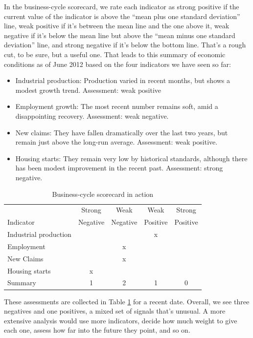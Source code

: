 In the business-cycle scorecard,
we rate each indicator as strong positive if
the current value of the indicator is above the
``mean plus one standard deviation'' line,
weak positive if it's between the mean line and the one above it,
weak negative if it's below the mean line but above
the ``mean minus one standard deviation'' line,
and strong negative if it's below the bottom line.
That's a rough cut, to be sure, but a useful one.
That leads to this summary of economic conditions as of June 2012
based on the four indicators we have seen so far:
\begin{itemize}
\item Industrial production:  Production varied in recent months, but shows a modest growth trend.
Assessment:  weak positive

\item Employment growth:  The most recent number remains soft, amid a disappointing recovery. Assessment:  weak negative.

\item New claims:  They have fallen dramatically
over the last two years, but remain just above the long-run average.
Assessment:  weak positive.
\item Housing starts:  They remain very low by historical standards,
although there has been modest improvement in the recent past.
Assessment:  strong negative.
\end{itemize}


\begin{table}[h!]
\centering
\caption{Business-cycle scorecard in action} %
\begin{tabular}{lcccc}
\toprule
            &  Strong    &  Weak  &  Weak   &  Strong  \\
Indicator   &  Negative  & Negative & Positive & Positive \\
\midrule
Industrial production  &&& x \\
Employment             && x &  \\
New Claims             && x \\
Housing starts         & x &  \\
\midrule
Summary                & 1 & 2 & 1 & 0 \\
\bottomrule
\end{tabular}
\label{tab:scorecard}
\end{table}

These assessments are collected in Table \ref{tab:scorecard}
for a recent date.
Overall, we see three negatives and one positives,
a mixed set of signals that's unusual.
A more extensive analysis would use more indicators,
decide how much weight to give each one,
assess how far into the future they point, and so on.


